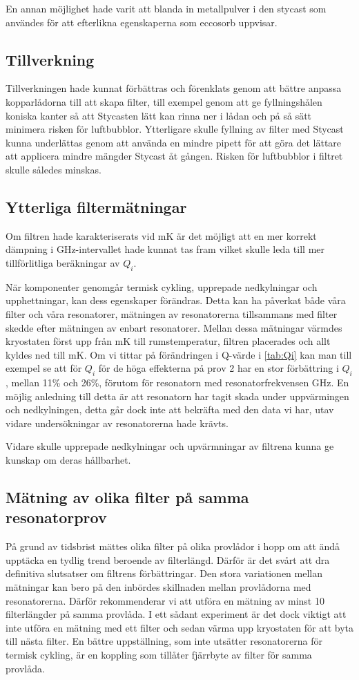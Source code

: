 \documentclass[main.tex]{subfiles}
\begin{document}
En annan möjlighet hade varit att blanda in metallpulver i den stycast som användes för att efterlikna egenskaperna som eccosorb uppvisar. 

\subsection{Tillverkning}
Tillverkningen hade kunnat förbättras och förenklats genom att bättre anpassa kopparlådorna till att skapa filter, till exempel genom att ge fyllningshålen koniska kanter så att Stycasten lätt kan rinna ner i lådan och på så sätt minimera risken för luftbubblor. Ytterligare skulle fyllning av filter med Stycast kunna underlättas genom att använda en mindre pipett för att göra det lättare att applicera mindre mängder Stycast åt gången. Risken för luftbubblor i filtret skulle således minskas.

\subsection{Ytterliga filtermätningar}
Om filtren hade karakteriserats vid \unit[10]{mK} är det möjligt att en mer korrekt dämpning i \unit[4-8]{GHz}-intervallet hade kunnat tas fram vilket skulle leda till mer tillförlitliga beräkningar av $Q_i$.

När komponenter genomgår termisk cykling, upprepade nedkylningar och upphettningar, kan dess egenskaper förändras. Detta kan ha påverkat både våra filter och våra resonatorer, mätningen av resonatorerna tillsammans med filter skedde efter mätningen av enbart resonatorer. Mellan dessa mätningar värmdes kryostaten först upp från \unit[10]{mK} till rumstemperatur, filtren placerades och allt kyldes ned till \unit[10]{mK}. Om vi tittar på förändringen i Q-värde i \ref{tab:Qi} kan man till exempel se att för $Q_i$ för de höga effekterna på prov 2 har en stor förbättring i $Q_i$, mellan 11\% och 26\%, förutom för resonatorn med resonatorfrekvensen \unit[7,322]{GHz}. En möjlig anledning till detta är att resonatorn har tagit skada under uppvärmingen och nedkylningen, detta går dock inte att bekräfta med den data vi har, utav vidare undersökningar av resonatorerna hade krävts.

Vidare skulle upprepade nedkylningar och upvärmningar av filtrena kunna ge kunskap om deras hållbarhet.

\subsection{Mätning av olika filter på samma resonatorprov}
På grund av tidsbrist mättes olika filter på olika provlådor i hopp om att ändå upptäcka en tydlig trend beroende av filterlängd. Därför är det svårt att dra definitiva slutsatser om filtrens förbättringar. Den stora variationen mellan mätningar kan bero på den inbördes skillnaden mellan provlådorna med resonatorerna. Därför rekommenderar vi att utföra en mätning av minst 10 filterlängder på samma provlåda. I ett sådant experiment är det dock viktigt att inte utföra en mätning med ett filter och sedan värma upp kryostaten för att byta till nästa filter. En bättre uppställning, som inte utsätter resonatorerna för termisk cykling, är en koppling som tillåter fjärrbyte av filter för samma provlåda.
\end{document}
